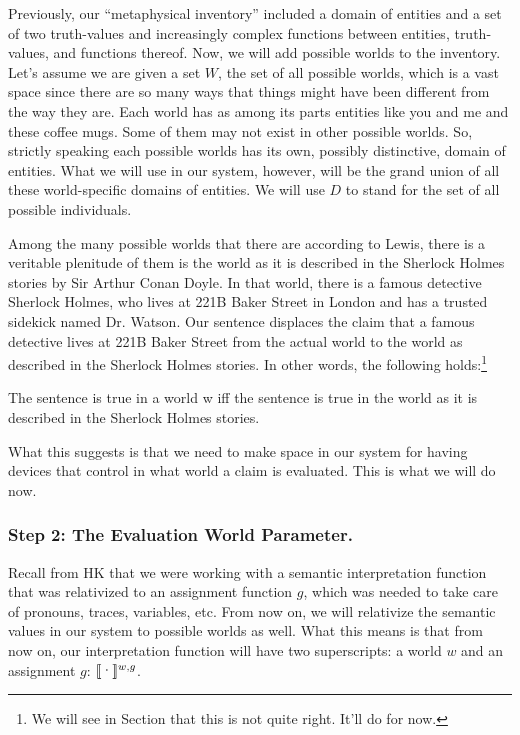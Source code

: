 %
Previously, our ``metaphysical inventory'' included a domain of entities and a
set of two truth-values and increasingly complex functions between entities,
truth-values, and functions thereof. Now, we will add possible worlds to the
inventory. Let's assume we are given a set $W$, the set of all possible worlds,
which is a vast space since there are so many ways that things might have been
different from the way they are. Each world has as among its parts entities like
you and me and these coffee mugs. Some of them may not exist in other possible
worlds. So, strictly speaking each possible worlds has its own, possibly
distinctive, domain of entities. What we will use in our system, however, will
be the grand union of all these world-specific domains of entities. We will use
$D$ to stand for the set of all possible individuals.

Among the many possible worlds that there are \dash according to Lewis, there is
a veritable plenitude of them \dash is the world as it is described in the
Sherlock Holmes stories by Sir Arthur Conan Doyle. In that world, there is a
famous detective Sherlock Holmes, who lives at 221B Baker Street in London and
has a trusted sidekick named Dr. Watson. Our sentence  displaces the
claim that a famous detective lives at 221B Baker Street from the actual world
to the world as described in the Sherlock Holmes stories. In other words, the
following holds:\footnote{We will see in Section  that
  this is not quite right. It'll do for now.}

\ex The sentence  is true in a world w iff the sentence  is true in the world as it is described
in the Sherlock Holmes stories. \xe

What this suggests is that we need to make space in our system for having
devices that control in what world a claim is evaluated. This is what we will do
now.

\subsubsection{Step 2: The Evaluation World Parameter.} \label{sec:eval-world-param}

Recall from H\amp K that we were working with a semantic interpretation function
that was relativized to an assignment function $g$, which was needed to take
care of pronouns, traces, variables, etc. From now on, we will relativize the
semantic values in our system to possible worlds as well. What this means is
that from now on, our interpretation function will have two superscripts: a
world $w$ and an assignment $g$: $\sv{\mbox{\textperiodcentered}}^{w,g}$.


